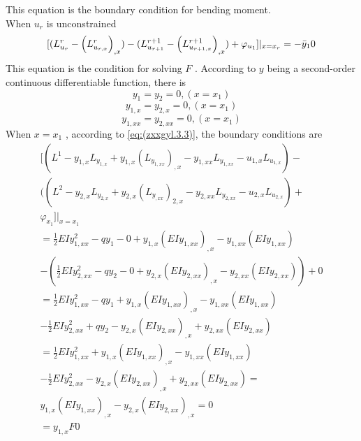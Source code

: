 This equation is the boundary condition for bending moment.
\\
When $ u_r $ is unconstrained
\begin{equation} \label{eq:(example.zcwz.10)}    
[(L^ {r}_ {u_r} - \left(L^ {r}_ {u_{r,x}}\right)_{,x})-(L^{r+1}_{u_{r+1}} - \left(L^{r+1}_{u_{r+1,x}}\right)_{,x})+\varphi_{u_1}]|_{x=x_r} 
\\=-\bar {y}_1
0
\end{equation}
This equation is the condition for solving $ F $ .
According to $ y$  being a second-order continuous differentiable function, there is
\begin{equation} \label{eq:(example.zcwz.11)}    
y_1=y_2
=0,(x=x_1)
\end{equation}
\begin{equation} \label{eq:(example.zcwz.12)}    
y_{1,x}=y_{2,x}
=0,(x=x_1)
\end{equation}
\begin{equation} \label{eq:(example.zcwz.12)}    
y_{1,xx}=y_{2,xx}
=0,(x=x_1)
\end{equation}
When $ x=x_1 $ , according to \ref{eq:(zxxgyl.3.3)}, the boundary conditions are
\begin{multline} \label{eq:(example.zcwz.7)}    
[(L^ {1}-y_ {1,x} L_{y_{1,x}}   + y_{1,x} \left(L_{y_{1,xx}}\right)_{,x}
-y_{1,xx} L_{y_{1,xx}} 
-u_{1,x} L_{u_{1,x}})-
\\((L^ {2}-y_ {2,x} L_{y_{2,x}}   + y_{2,x} \left(L_{y_{,xx}}\right)_{2,x}
-y_{2,xx} L_{y_{2,xx}} 
-u_{2,x} L_{u_{2,x}})+\\
\varphi_{x_{1}}]|_{x=x_1}  
\\=\frac{1} {2}EIy_ {1,xx}^2-qy_1-0+y_{1,x} \left(EI{y_{1,xx}}\right)_{,x}-y_{1,xx} \left(EI{y_{1,xx}}\right)
\\-(\frac{1} {2}EIy_ {2,xx}^2-qy_2-0+y_{2,x} \left(EI{y_{2,xx}}\right)_{,x}-y_{2,xx} \left(EI{y_{2,xx}}\right))+0
\\=\frac{1} {2}EIy_ {1,xx}^2-qy_1+y_{1,x} \left(EI{y_{1,xx}}\right)_{,x}-y_{1,xx} \left(EI{y_{1,xx}}\right)
\\-\frac{1} {2}EIy_ {2,xx}^2+qy_2-y_{2,x} \left(EI{y_{2,xx}}\right)_{,x}+y_{2,xx} \left(EI{y_{2,xx}}\right)
\\=\frac{1} {2}EIy_ {1,xx}^2+y_{1,x} \left(EI{y_{1,xx}}\right)_{,x}-y_{1,xx} \left(EI{y_{1,xx}}\right)
\\-\frac{1} {2}EIy_ {2,xx}^2-y_{2,x} \left(EI{y_{2,xx}}\right)_{,x}+y_{2,xx} \left(EI{y_{2,xx}}\right)
=\\y_{1,x} \left(EI{y_{1,xx}}\right)_{,x}
-y_{2,x} \left(EI{y_{2,xx}}\right)_{,x}=0
\\=y_ {1,x}F
0
\end{multline}
